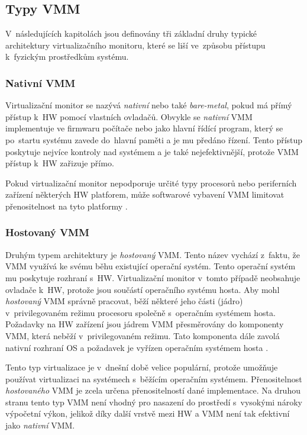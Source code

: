 \subsection{Typy VMM}
\label{chapter:virtualization:vmm:types}
V~následujících kapitolách jsou definovány tři základní druhy typické architektury virtualizačního monitoru, které se liší ve~způsobu
přístupu k~fyzickým prostředkům systému.
\subsubsection{Nativní VMM}
\label{chapter:virtualization:vmm:types:native}
Virtualizační monitor se nazývá \textit{nativní} nebo také \textit{bare-metal}, pokud má přímý přístup k~HW pomocí vlastních ovladačů.
Obvykle se \textit{nativní} VMM implementuje ve firmwaru počítače nebo jako hlavní řídící program, který se po~startu systému
zavede do~hlavní paměti a je mu předáno řízení. Tento přístup poskytuje nejvíce kontroly nad systémem a je také nejefektivnější,
protože VMM přístup k~HW zařizuje přímo.

Pokud virtualizační monitor nepodporuje určité typy procesorů nebo periferních zařízení některých HW platforem, může softwarové
vybavení VMM limitovat přenositelnost na tyto platformy \cite{cvut:presentation:virt1}.
\subsubsection{Hostovaný VMM}
\label{chapter:virtualization:vmm:types:hosted}
Druhým typem architektury je \textit{hostovaný} VMM. Tento název vychází z~faktu, že VMM využívá ke svému běhu existující operační
systém. Tento operační systém mu poskytuje rozhraní s~HW. Virtualizační monitor v~tomto případě neobsahuje ovladače k~HW,
protože jsou součástí operačního systému hosta. Aby mohl \textit{hostovaný} VMM správně pracovat, běží některé jeho části (jádro)
v~privilegovaném režimu procesoru společně s~operačním systémem hosta. Požadavky na HW zařízení jsou jádrem VMM přesměrovány
do komponenty VMM, která neběží v~privilegovaném režimu. Tato komponenta dále zavolá nativní rozhraní OS a požadavek je 
vyřízen operačním systémem hosta \cite{cvut:presentation:virt1}.

Tento typ virtualizace je v~dnešní době velice populární, protože umožňuje používat virtualizaci na systémech s~běžícím operačním 
systémem. Přenositelnost \textit{hostovaného} VMM je zcela určena přenositelností dané implementace. Na druhou stranu tento
typ VMM není vhodný pro nasazení do prostředí s~vysokými nároky výpočetní výkon, jelikož díky další vrstvě mezi HW a VMM není tak
efektivní jako \textit{nativní} VMM.
